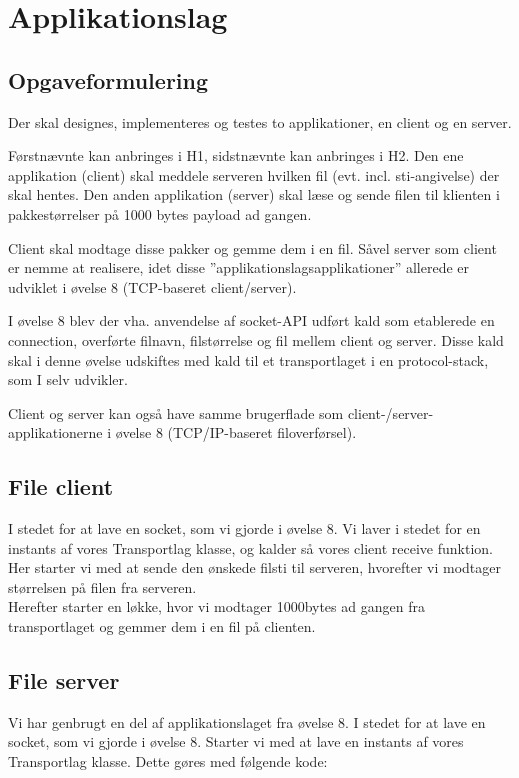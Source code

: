 \chapter{Applikationslag}

\section{Opgaveformulering}

Der skal designes, implementeres og testes to applikationer, en client og en server.

Førstnævnte kan anbringes i H1, sidstnævnte kan anbringes i H2.
Den ene applikation (client) skal meddele serveren hvilken fil (evt. incl. sti-angivelse) der skal hentes.
Den anden applikation (server) skal læse og sende filen til klienten i pakkestørrelser på 1000 bytes payload ad gangen.

Client skal modtage disse pakker og gemme dem i en fil.
Såvel server som client er nemme at realisere, idet disse ”applikationslagsapplikationer” allerede er udviklet i øvelse 8 (TCP-baseret client/server).

I øvelse 8 blev der vha. anvendelse af socket-API udført kald som etablerede en connection, overførte filnavn, filstørrelse og fil mellem client og server. Disse kald skal i denne øvelse udskiftes med kald til et transportlaget i en protocol-stack, som I selv udvikler. 

Client og server kan også have samme brugerflade som client-/server-applikationerne i øvelse 8 (TCP/IP-baseret filoverførsel).

\section{File client}

I stedet for at lave en socket, som vi gjorde i øvelse 8. Vi laver i stedet for en instants af vores Transportlag klasse, og kalder så vores client receive funktion. Her starter vi med at sende den ønskede filsti til serveren, hvorefter vi modtager størrelsen på filen fra serveren. \\ Herefter starter en løkke, hvor vi modtager 1000bytes ad gangen fra transportlaget og gemmer dem i en fil på clienten.

\section{File server}

Vi har genbrugt en del af applikationslaget fra øvelse 8. I stedet for at lave en socket, som vi gjorde i øvelse 8. Starter vi med at lave en instants af vores Transportlag klasse. Dette gøres med følgende kode: 

